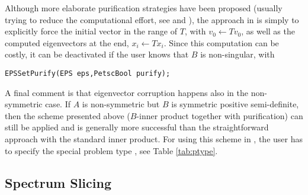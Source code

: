 Although more elaborate purification strategies have been proposed (usually trying to reduce the computational effort, see \citep{Nour-Omid:1987:HIS} and \citep{Meerbergen:1997:IRA}), the approach in \slepc is simply to explicitly force the initial vector in the range of $T$, with $v_0\leftarrow Tv_0$, as well as the computed eigenvectors at the end, $x_i\leftarrow Tx_i$. Since this computation can be costly, it can be deactivated if the user knows that $B$ is non-singular, with
	\begin{Verbatim}[fontsize=\small]
	EPSSetPurify(EPS eps,PetscBool purify);
	\end{Verbatim}

A final comment is that eigenvector corruption happens also in the non-symmetric case. If $A$ is non-symmetric but $B$ is symmetric positive semi-definite, then the scheme presented above ($B$-inner product together with purification) can still be applied and is generally more successful than the straightforward approach with the standard inner product. For using this scheme in \slepc, the user has to specify the special problem type , see Table \ref{tab:ptype}.

\subsection{Spectrum Slicing}
\label{sec:slice}

